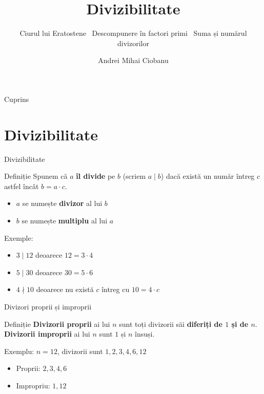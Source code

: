 \documentclass{beamer}
\title{Divizibilitate}
\subtitle{Ciurul lui Eratostene \textbar\ Descompunere în factori primi \textbar\ Suma și numărul divizorilor}
\author{Andrei Mihai Ciobanu}
\institute{Algolymp Summer School}
\date{}
\begin{document}
\begin{frame}
  \titlepage
\end{frame}

\begin{frame}{Cuprins}
  \tableofcontents
\end{frame}

\section{Divizibilitate}

\begin{frame}{Divizibilitate}
  \begin{block}{Definiție}
    Spunem că $a$ \textbf{îl divide} pe $b$ (scriem $a \mid b$) dacă există un număr întreg $c$
    astfel încât $b = a \cdot c$.
  \end{block}
  \bigskip
  \begin{itemize}
    \item $a$ se numește \textbf{divizor} al lui $b$
    \item $b$ se numește \textbf{multiplu} al lui $a$
  \end{itemize}
  \bigskip
  Exemple:
  \begin{itemize}
    \item $3 \mid 12$ deoarece $12 = 3 \cdot 4$
    \item $5 \mid 30$ deoarece $30 = 5 \cdot 6$
    \item $4 \nmid 10$ deoarece nu există $c$ întreg cu $10 = 4 \cdot c$
  \end{itemize}
\end{frame}

\begin{frame}{Divizori proprii și improprii}
  \begin{block}{Definiție}
    \textbf{Divizorii proprii} ai lui $n$ sunt toți divizorii săi \textbf{diferiți de $1$ și de $n$}. \\
    \textbf{Divizorii improprii} ai lui $n$ sunt $1$ și $n$ însuși.
  \end{block}
  \bigskip
  Exemplu: $n = 12$, divizorii sunt $1, 2, 3, 4, 6, 12$
  \begin{itemize}
    \item Proprii: $2, 3, 4, 6$
    \item Impropriu: $1, 12$
  \end{itemize}
\end{frame}
\end{document}
